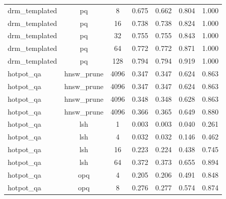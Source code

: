 \begin{longtable}{lcccccc}
drm\_templated & pq & 8 & 0.675 & 0.662 & 0.804 & 1.000 \\
drm\_templated & pq & 16 & 0.738 & 0.738 & 0.824 & 1.000 \\
drm\_templated & pq & 32 & 0.755 & 0.755 & 0.843 & 1.000 \\
drm\_templated & pq & 64 & 0.772 & 0.772 & 0.871 & 1.000 \\
drm\_templated & pq & 128 & 0.794 & 0.794 & 0.919 & 1.000 \\
hotpot\_qa & hnsw\_prune & 4096 & 0.347 & 0.347 & 0.624 & 0.863 \\
hotpot\_qa & hnsw\_prune & 4096 & 0.347 & 0.347 & 0.624 & 0.863 \\
hotpot\_qa & hnsw\_prune & 4096 & 0.348 & 0.348 & 0.628 & 0.863 \\
hotpot\_qa & hnsw\_prune & 4096 & 0.366 & 0.365 & 0.649 & 0.880 \\
hotpot\_qa & lsh & 1 & 0.003 & 0.003 & 0.040 & 0.261 \\
hotpot\_qa & lsh & 4 & 0.032 & 0.032 & 0.146 & 0.462 \\
hotpot\_qa & lsh & 16 & 0.223 & 0.224 & 0.438 & 0.745 \\
hotpot\_qa & lsh & 64 & 0.372 & 0.373 & 0.655 & 0.894 \\
hotpot\_qa & opq & 4 & 0.205 & 0.206 & 0.491 & 0.848 \\
hotpot\_qa & opq & 8 & 0.276 & 0.277 & 0.574 & 0.874 \\
\end{longtable}
